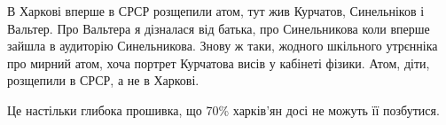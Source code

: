 В Харкові вперше в СРСР розщепили атом, тут жив Курчатов, Синельніков і
Вальтер. Про Вальтера я дізналася від батька, про Синельникова коли вперше
зайшла в аудиторію Синельникова. Знову ж таки, жодного шкільного утрєнніка про
мирний атом, хоча портрет Курчатова висів у кабінеті фізики. Атом, діти,
розщепили в СРСР, а не в Харкові.

Це настільки глибока прошивка, що 70\% харків'ян досі не можуть її позбутися.
